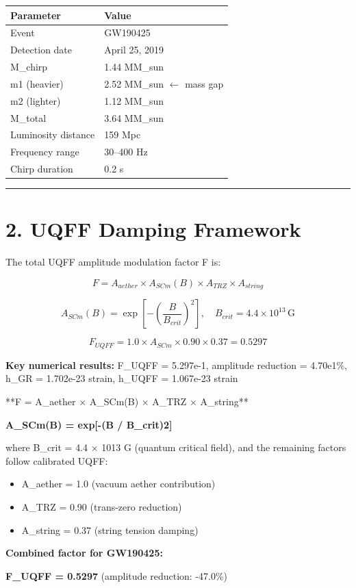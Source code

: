 \documentclass[11pt]{article}
\begin{document}
\begin{center}
\begin{longtable}{ll}
\toprule
Parameter & Value \tabularnewline
\midrule
\endhead
Event & GW190425 \tabularnewline
Detection date & April 25, 2019 \tabularnewline
M\_chirp & 1.44 MM\_sun \tabularnewline
m1 (heavier) & 2.52 MM\_sun $\leftarrow$ mass gap \tabularnewline
m2 (lighter) & 1.12 MM\_sun \tabularnewline
M\_total & 3.64 MM\_sun \tabularnewline
Luminosity distance & 159 Mpc \tabularnewline
Frequency range & 30--400 Hz \tabularnewline
Chirp duration & 0.2 s \tabularnewline
\bottomrule
\end{longtable}
\end{center}

\noindent\rule{\textwidth}{0.4pt}

\section*{2. UQFF Damping Framework}

The total UQFF amplitude modulation factor F is:

$$F = A_{aether} \times A_{SCm}(B) \times A_{TRZ} \times A_{string}$$

$$A_{SCm}(B) = \exp\!\left[-\left(\frac{B}{B_{crit}}\right)^2\right], \quad B_{crit} = 4.4\times10^{13}\,\mathrm{G}$$

$$F_{UQFF} = 1.0 \times A_{SCm} \times 0.90 \times 0.37 = 0.5297$$

\textbf{Key numerical results:} F\_UQFF = 5.297e-1, amplitude reduction = 4.70e1\%, h\_GR = 1.702e-23 strain, h\_UQFF = 1.067e-23 strain

**F = A\_aether $\times$ A\_SCm(B) $\times$ A\_TRZ $\times$ A\_string**

\textbf{A\_SCm(B) = exp[-(B / B\_crit)2]}

where B\_crit = 4.4 $\times$ 1013 G (quantum critical field), and the remaining factors follow calibrated UQFF:

\begin{itemize}
  \item A\_aether = 1.0 (vacuum aether contribution)
  \item A\_TRZ = 0.90 (trans-zero reduction)
  \item A\_string = 0.37 (string tension damping)
\end{itemize}

\textbf{Combined factor for GW190425:}

\textbf{F\_UQFF = 0.5297} (amplitude reduction: -47.0\%)
\end{document}

